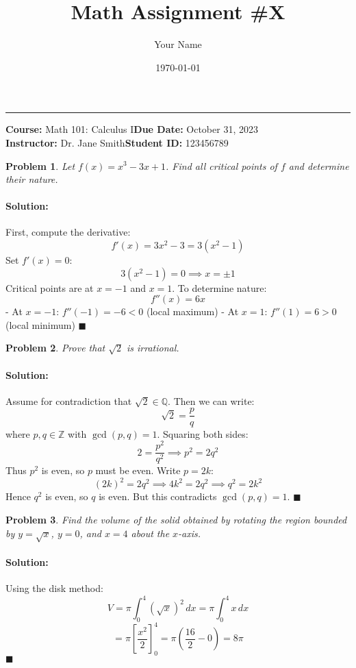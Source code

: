 \documentclass[12pt, letterpaper]{article}
\title{\textbf{Math Assignment \#X}}
\author{Your Name}
\date{\today}
\newtheorem{problem}{Problem}
\newenvironment{solution}{\paragraph{\textbf{Solution:}}}{\hfill$\blacksquare$}
\newcommand{\Q}{\mathbb{Q}}
\newcommand{\Z}{\mathbb{Z}}
\newcommand{\course}{Math 101: Calculus I}
\newcommand{\instructor}{Dr. Jane Smith}
\begin{document}
\maketitle
\hrule
\vspace{0.5cm}
\textbf{Course:} \course \hfill \textbf{Due Date:} October 31, 2023 \\
\textbf{Instructor:} \instructor \hfill \textbf{Student ID:} 123456789
\vspace{1cm}

\begin{problem}
  Let $f(x) = x^3 - 3x + 1$. Find all critical points of $f$ and determine their nature.
\end{problem}

\begin{solution}
  First, compute the derivative:
  \[
    f'(x) = 3x^2 - 3 = 3(x^2 - 1)
  \]
  Set $f'(x) = 0$:
  \[
    3(x^2 - 1) = 0 \implies x = \pm 1
  \]
  Critical points are at $x = -1$ and $x = 1$. To determine nature:
  \[
    f''(x) = 6x
  \]
  - At $x = -1$: $f''(-1) = -6 < 0$ (local maximum)
  - At $x = 1$: $f''(1) = 6 > 0$ (local minimum)
\end{solution}

\begin{problem}
  Prove that $\sqrt{2}$ is irrational.
\end{problem}

\begin{solution}
  Assume for contradiction that $\sqrt{2} \in \Q$. Then we can write:
  \[
    \sqrt{2} = \frac{p}{q}
  \]
  where $p, q \in \Z$ with $\gcd(p,q) = 1$. Squaring both sides:
  \[
    2 = \frac{p^2}{q^2} \implies p^2 = 2q^2
  \]
  Thus $p^2$ is even, so $p$ must be even. Write $p = 2k$:
  \[
    (2k)^2 = 2q^2 \implies 4k^2 = 2q^2 \implies q^2 = 2k^2
  \]
  Hence $q^2$ is even, so $q$ is even. But this contradicts $\gcd(p,q) = 1$.
\end{solution}

\begin{problem}
  Find the volume of the solid obtained by rotating the region bounded by $y = \sqrt{x}$, $y = 0$, and $x = 4$ about the $x$-axis.
\end{problem}

\begin{solution}
  Using the disk method:
  \[
    V = \pi \int_{0}^{4} (\sqrt{x})^2 \,dx = \pi \int_{0}^{4} x \,dx
  \]
  \[
    = \pi \left[ \frac{x^2}{2} \right]_{0}^{4} = \pi \left( \frac{16}{2} - 0 \right) = 8\pi
  \]
\end{solution}

\end{document}
